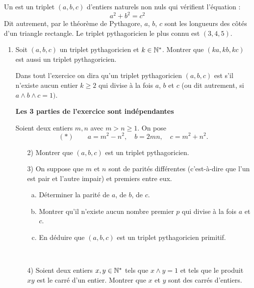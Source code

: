\begin{td-exo}[] %
	Un  est un triplet $(a,b,c)$ d'entiers naturels non nuls qui vérifient
	l'équation :
	\[
	a^2+b^2=c^2
	\]
	Dit autrement, par le théorème de Pythagore, $a$, $b$, $c$ sont les longueurs des côtés d'un triangle rectangle.
	Le triplet pythagoricien le plus connu est $(3, 4, 5)$.
	
	\begin{enumerate}[1)]
		\item Soit $(a,b,c)$ un triplet pythagoricien et $k\in\mathbb{N}^\ast$. Montrer que $(ka, kb, kc)$ est aussi
		un triplet pythagoricien.
		
		Dans tout l'exercice on dira qu'un triplet pythagoricien $(a,b,c)$ est  s'il n'existe
		aucun entier $k\ge 2$ qui divise à la fois $a$, $b$ et $c$ (ou dit autrement, si $a\wedge b\wedge c=1)$.
		
		\begin{center}
			\textbf{Les 3 parties de l'exercice sont indépendantes}
		\end{center}
		
		\begin{ga-subpart}
			Soient deux entiers $m, n$ avec $m>n\ge 1$. On pose
			\[
			(\ast)\qquad a=m^2-n^2,\quad b=2mn,\quad c=m^2+n^2.
			\]
			\begin{enumerate}[]
				\item[2)] Montrer que $(a, b, c)$ est un triplet pythagoricien.
				\item[3)] On suppose que $m$ et $n$ sont de parités différentes (c'est-à-dire que l'un
				est pair et l'autre impair) et premiers entre eux.
				\begin{enumerate}[a)]
					\item Déterminer la parité de $a$, de $b$, de $c$.
					
					\item Montrer qu'il n'existe aucun nombre premier $p$ qui divise à la fois $a$ et $c$.
					
					\item En déduire que $(a,b,c)$ est un triplet pythagoricien primitif.
				\end{enumerate}
			\end{enumerate}
		\end{ga-subpart}
		
		\begin{ga-subpart}[Intermède]\,
			\begin{enumerate}[]
				\item[4)] Soient deux entiers $x, y\in\mathbb{N}^\ast$ tels que $x\wedge y=1$ et tels que le produit $xy$ est le carré d'un entier. Montrer que $x$ et $y$ sont des carrés d'entiers.
			\end{enumerate}
		\end{ga-subpart}
		

\end{enumerate}
\end{td-exo}
